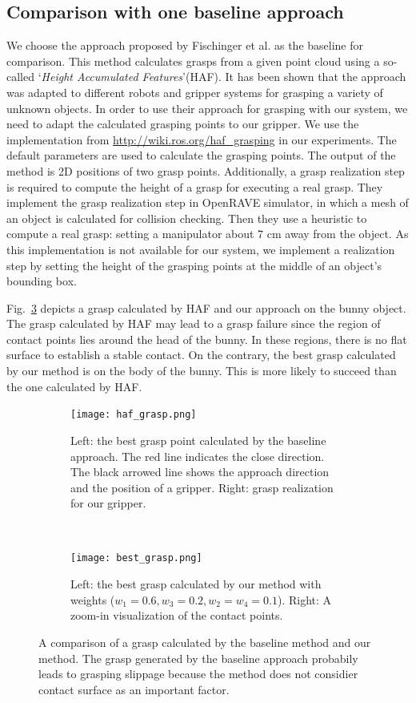 \subsection{Comparison with one baseline approach}
We choose the approach proposed by Fischinger et al. \cite{FischingerWV15} as the baseline  for comparison. This method calculates grasps from a given point cloud using a so-called `\textit{Height Accumulated Features}'(HAF). It has been shown that the approach was adapted to different robots and gripper systems for grasping a variety of unknown objects. In order to use their approach for grasping with our system, we need to adapt the calculated grasping points to our gripper. We use the implementation from \url{http://wiki.ros.org/haf_grasping} in our experiments. The default parameters are used to calculate the grasping points. The output of the method is 2D positions of two grasp points. Additionally, a grasp realization step is required to compute the height of a grasp for executing a real grasp. They implement the grasp realization step in OpenRAVE simulator, in which a  mesh of an object is calculated for collision checking. Then they use a heuristic to compute a real grasp: setting a manipulator about 7 cm away from the object. As this implementation is not available for our system, we implement a realization step by setting the height of the grasping points at the middle of an object's bounding box.  

Fig.~\ref{fig:baseline_comparison} depicts a grasp calculated by HAF and our approach on the bunny object. The grasp calculated by HAF may lead to a grasp failure since the region of contact points lies around the head of the bunny. In these regions, there is no flat surface to establish a stable contact. On the contrary, the best grasp calculated by our method is on the body of the bunny. This is more likely to succeed than the one calculated by HAF.  
\begin{figure}[!htb]
    \centering
    \begin{subfigure}[t]{0.45\textwidth}
        \texttt{[image: haf\_grasp.png]}
        \caption{Left: the best grasp point calculated by the baseline approach. The red line indicates the close direction. The black arrowed line shows the approach direction and the position of a gripper. Right: grasp realization for our gripper.}
        \label{fig:haf_grasp}
    \end{subfigure}
    ~ %
    \begin{subfigure}[t]{0.45\textwidth}
        \texttt{[image: best\_grasp.png]}
        \caption{Left: the best grasp calculated by our method with weights ($w_1 = 0.6, w_3=0.2, w_2=w_4=0.1$). Right: A zoom-in visualization of the contact points.  }
        \label{fig:best_grasp}
    \end{subfigure}
    \caption{A comparison of a grasp calculated by the baseline method and our method. The grasp generated by the baseline approach probabily leads to grasping slippage because the method does not considier contact surface as an  important factor.}\label{fig:baseline_comparison}
\end{figure}

